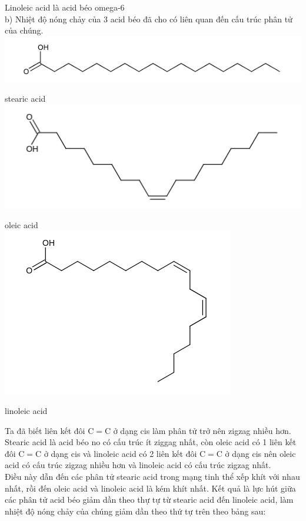 \documentclass[10pt]{article}
\begin{document}
Linoleic acid là acid béo omega-6\\
b) Nhiệt độ nóng chảy của 3 acid béo đã cho có liên quan đến cấu trúc phân tử của chúng.\\
\includegraphics{smile-2a132e8d083b45345ea11411dc5cc8586c2e841e}

stearic acid\\
\includegraphics{smile-a31f3f8f63a3436209e87cd734e7dda04fa9d291}

oleic acid\\
\includegraphics{smile-cf2e3d07a1acd9985c0b97107fd7089cd992f3e3}

linoleic acid

Ta đã biết liên kết đôi $\mathrm{C}=\mathrm{C}$ ở dạng cis làm phân tử trở nên zigzag nhiều hơn. Stearic acid là acid béo no có cấu trúc ít ziggag nhất, còn oleic acid có 1 liên kết đôi $\mathrm{C}=\mathrm{C}$ ở dạng cis và linoleic acid có 2 liên kết đôi $\mathrm{C}=\mathrm{C}$ ở dạng cis nên oleic acid có cấu trúc zigzag nhiều hơn và linoleic acid có cấu trúc zigzag nhất.\\
Điều này dẫn đến các phân tử stearic acid trong mạng tinh thể xếp khít với nhau nhất, rồi đến oleic acid và linoleic acid là kém khít nhất. Kết quả là lực hút giữa các phân tử acid béo giảm dần theo thự tự từ stearic acid đến linoleic acid, làm nhiệt độ nóng chảy của chúng giảm dần theo thứ tự trên theo bảng sau:
\end{document}
